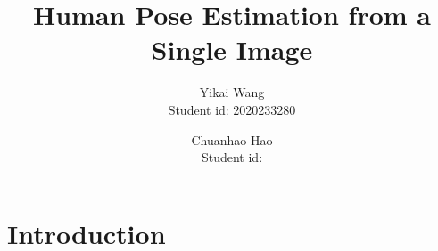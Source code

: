 \documentclass[final]{cvpr}
\begin{document}
\title{Human Pose Estimation from a Single Image}

\author{Yikai Wang\\
Student id: 2020233280\\
{}
\and
Chuanhao Hao\\
Student id:\\
{}
}

\maketitle


\begin{abstract}

\end{abstract}

\section{Introduction}
\end{document}
